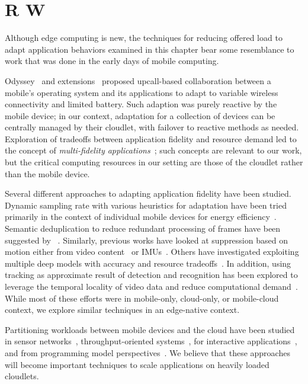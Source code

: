 \section{R W}
\label{sec:related}

Although edge computing is new, the techniques for reducing offered load to
adapt application behaviors examined in this chapter bear some resemblance to
work that was done in the early days of mobile computing.

Odyssey~\cite{Noble1997} and extensions~\cite{Flinn1999} proposed upcall-based
collaboration between a mobile's operating system and its applications to adapt
to variable wireless connectivity and limited battery. Such adaption was purely
reactive by the mobile device; in our context, adaptation for a collection of
devices can be centrally managed by their cloudlet, with failover to reactive
methods as needed. Exploration of tradeoffs between application fidelity and
resource demand led to the concept of {\em multi-fidelity
applications}~\cite{Satya1999}; such concepts are relevant to our work, but the
critical computing resources in our setting are those of the cloudlet rather
than the mobile device.

Several different approaches to adapting application fidelity have been studied.
Dynamic sampling rate with various heuristics for adaptation have been tried
primarily in the context of individual mobile devices for energy
efficiency~\cite{lorincz2009mercury, lorincz2008resource, vallina2012energy,
lane2010survey}. Semantic deduplication to reduce redundant processing of frames
have been suggested by ~\cite{Hu2015, kang2017noscope, hsieh2018focus,
zhang2015design}. Similarly, previous works have looked at suppression based on
motion either from video content~\cite{naderiparizi2017glimpse,
lebeckcollaborative} or IMUs~\cite{jain2015overlay}. Others have investigated
exploiting multiple deep models with accuracy and resource
tradeoffs~\cite{han2016mcdnn,jiang2018chameleon}. In addition, using tracking as
approximate result of detection and recognition has been explored to leverage
the temporal locality of video data and reduce computational
demand~\cite{wang2017scalable, chen2015glimpse, you1999hybrid}. While most of
these efforts were in mobile-only, cloud-only, or mobile-cloud context, we
explore similar techniques in an edge-native context.


Partitioning workloads between mobile devices and the cloud have been
studied in sensor networks~\cite{newton2009wishbone},
throughput-oriented systems~\cite{cuervo2010maui, yi2017lavea}, for
interactive applications~\cite{ra2011odessa, chen2015glimpse}, and
from programming model perspectives~\cite{balan2003tactics}. We believe
that these approaches will become important techniques to scale
applications on heavily loaded cloudlets.